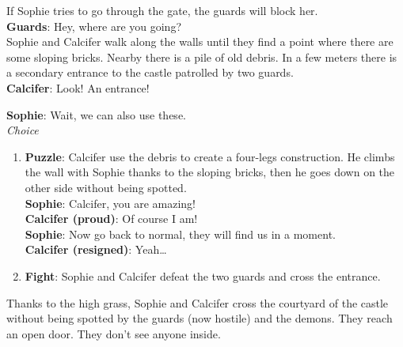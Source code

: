 \noindent If Sophie tries to go through the gate, the guards will block her.\\

\textbf{Guards}: Hey, where are you going?\\


\noindent Sophie and Calcifer walk along the walls until they find a point where there are some sloping bricks. Nearby there is a pile of old debris.
In a few meters there is a secondary entrance to the castle patrolled by two guards.\\

\textbf{Calcifer}: Look! An entrance!

\textbf{Sophie}: Wait, we can also use these.\\

\textit{Choice}
\begin{enumerate}
  \item \textbf{Puzzle}: Calcifer use the debris to create a four-legs construction. He climbs the wall with Sophie thanks to the sloping bricks, then he goes down on the other side without being spotted.\\
  \textbf{Sophie}: Calcifer, you are amazing!\\
\textbf{Calcifer (proud)}: Of course I am!\\
\textbf{Sophie}: Now go back to normal, they will find us in a moment.\\
\textbf{Calcifer (resigned)}: Yeah…
  \item \textbf{Fight}: Sophie and Calcifer defeat the two guards and cross the entrance.
\end{enumerate}


\noindent Thanks to the high grass, Sophie and Calcifer cross the courtyard of the castle without being spotted by the guards (now hostile) and the demons.
They reach an open door. They don’t see anyone inside.\\

